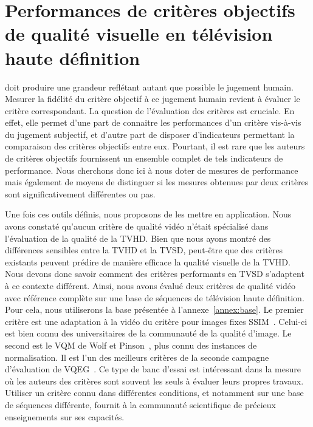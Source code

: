 \chapter{Performances de critères objectifs de qualité visuelle en télévision haute définition} \label{chap:evalCrit}
 doit produire une grandeur reflétant autant que possible le jugement humain. Mesurer la fidélité du critère objectif à ce jugement humain revient à évaluer le critère correspondant. La question de l'évaluation des critères est cruciale. En effet, elle permet d'une part de connaitre les performances d'un critère vis-à-vis du jugement subjectif, et d'autre part de disposer d'indicateurs permettant la comparaison des critères objectifs entre eux. Pourtant, il est rare que les auteurs de critères objectifs fournissent un ensemble complet de tels indicateurs de performance. Nous cherchons donc ici à nous doter de mesures de performance mais également de moyens de distinguer si les mesures obtenues par deux critères sont significativement différentes ou pas.

Une fois ces outils définis, nous proposons de les mettre en application. Nous avons constaté qu'aucun critère de qualité vidéo n'était spécialisé dans l'évaluation de la qualité de la TVHD. Bien que nous ayons montré des différences sensibles entre la TVHD et la TVSD, peut-être que des critères existants peuvent prédire de manière efficace la qualité visuelle de la TVHD. Nous devons donc savoir comment des critères performants en TVSD s'adaptent à ce contexte différent. Ainsi, nous avons évalué deux critères de qualité vidéo avec référence complète sur une base de séquences de télévision haute définition. Pour cela, nous utiliserons la base présentée à l'annexe~\ref{annex:base}. Le premier critère est une adaptation à la vidéo du critère pour images fixes SSIM~\cite{wang-vqasdm}. Celui-ci est bien connu des universitaires de la communauté de la qualité d'image. Le second est le VQM de Wolf et Pinson~\cite{wolf-vqmtech}, plus connu des instances de normalisation. Il est l'un des meilleurs critères de la seconde campagne d'évaluation de VQEG~\cite{vqeg-frtv2}. Ce type de banc d'essai est intéressant dans la mesure où les auteurs des critères sont souvent les seuls à évaluer leurs propres travaux. Utiliser un critère connu dans différentes conditions, et notamment sur une base de séquences différente, fournit à la communauté scientifique de précieux enseignements sur ses capacités.

